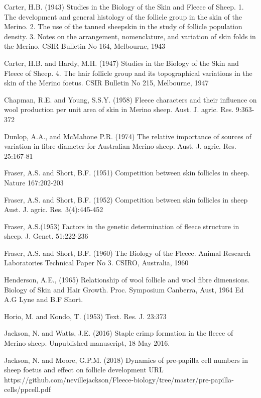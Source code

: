 \documentclass[titlepage]{article}  %
\begin{document}
\begin{thebibliography}{99}

Carter, H.B. (1943) Studies in the Biology of the Skin and Fleece of Sheep. 1. The development and general histology of the follicle group in the skin of the Merino. 2. The use of the tanned sheepskin in the study of follicle population density. 3. Notes on the arrangement, nomenclature, and variation of skin folds in the Merino. CSIR Bulletin No 164, Melbourne, 1943

Carter, H.B. and Hardy, M.H. (1947) Studies in the Biology of the Skin and Fleece of Sheep. 4. The hair follicle group and its topographical variations in the skin of the Merino foetus. CSIR Bulletin No 215, Melbourne, 1947

Chapman, R.E. and Young, S.S.Y. (1958) Fleece characters and their influence on wool production per unit area of skin in Merino sheep. Aust. J. agric. Res. 9:363-372

Dunlop, A.A., and McMahone P.R. (1974)  The relative importance of sources of variation in fibre diameter for Australian Merino sheep. Aust. J. agric. Res. 25:167-81

Fraser, A.S. and Short, B.F. (1951) Competition between skin follicles in sheep. Nature 167:202-203

Fraser, A.S. and Short, B.F. (1952) Competition between skin follicles in sheep Aust. J. agric. Res. 3(4):445-452

Fraser, A.S.(1953) Factors in the genetic determination of fleece structure in sheep. J. Genet. 51:222-236

Fraser, A.S. and Short, B.F. (1960) The Biology of the Fleece. Animal Research Laboratories Technical Paper No 3. CSIRO, Australia, 1960

Henderson, A.E., (1965) Relationship of wool follicle and wool fibre dimensions. Biology of Skin and Hair Growth. Proc. Symposium Canberra, Aust, 1964 Ed A.G Lyne and B.F Short.

Horio, M. and Kondo, T. (1953) Text. Res. J. 23:373

Jackson, N. and Watts, J.E. (2016) Staple crimp formation in the fleece of Merino sheep. Unpublished manuscript, 18 May 2016.


Jackson, N. and Moore, G.P.M. (2018)
Dynamics of pre-papilla cell numbers in sheep foetus and effect on follicle development URL https://github.com/nevillejackson/Fleece-biology/tree/master/pre-papilla-cells/ppcell.pdf


\end{thebibliography}
\end{document}
